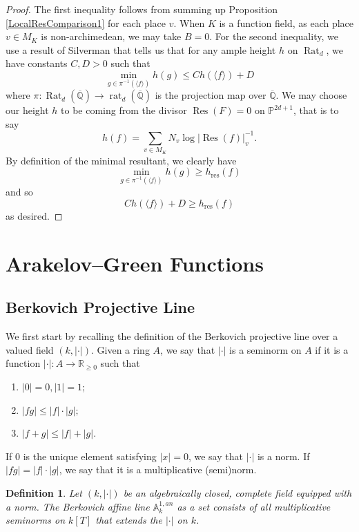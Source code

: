 \documentclass[10pt]{amsart}
\newcommand{\bb}{\mathbb}
\newcommand{\Res}{\operatorname{Res}}
\newcommand{\res}{\operatorname{res}}
\newcommand{\ovl}{\overline}
\newcommand{\berkA}{\mathbb{A}^{1,an}}
\newcommand{\Rat}{\operatorname{Rat}}
\newcommand{\rat}{\operatorname{rat}}
\numberwithin{theorem}{section}
\numberwithin{example}{section}
\newtheorem{definition}{Definition}
\numberwithin{definition}{section}
\begin{document}
\begin{proof}
The first inequality follows from summing up Proposition \ref{LocalResComparison1} for each place $v$. When $K$ is a function field, as each place $v \in M_K$ is non-archimedean, we may take $B = 0$. For the second inequality, we use a result of Silverman \cite[Lemma 6.32]{Sil12} that tells us that for any ample height $h$ on $\Rat_d$, we have constants $C,D > 0$ such that
$$\min_{g \in \pi^{-1}(\langle f \rangle)} h(g) \leq C h(\langle f \rangle) + D$$
where $\pi: \Rat_d(\ovl{\bb{Q}}) \to \rat_d(\ovl{\bb{Q}})$ is the projection map over $\ovl{\bb{Q}}$. We may choose our height $h$ to be coming from the divisor $\Res(F) = 0$ on $\bb{P}^{2d+1}$, that is to say
$$h(f) = \sum_{v \in M_K} N_v \log |\Res(f)|^{-1}_v.$$
By definition of the minimal resultant, we clearly have 
$$\min_{g \in \pi^{-1}(\langle f \rangle)} h(g) \geq h_{\res}(f)$$
and so
$$C h(\langle f \rangle) + D \geq h_{\res}(f)$$
as desired. 
\end{proof}

\section{Arakelov--Green Functions}
\subsection{Berkovich Projective Line} We first start by recalling the definition of the Berkovich projective line \cite{BR10, Ben19} over a valued field $(k, | \cdot |)$. Given a ring $A$, we say that $| \cdot |$ is a seminorm on $A$ if it is a function $| \cdot |: A \to \bb{R}_{\geq 0}$ such that 
\begin{enumerate}
\item $|0| = 0 , |1| = 1$;
\item $|fg| \leq |f| \cdot |g|;$
\item $|f+g| \leq |f| + |g|.$
\end{enumerate}

If $0$ is the unique element satisfying $|x| = 0$, we say that $| \cdot |$ is a norm. If $|fg| = |f| \cdot |g|$, we say that it is a multiplicative (semi)norm.

\begin{definition} \label{Chap2Defn1}
Let $(k, | \cdot |)$ be an algebraically closed, complete field equipped with a norm. The Berkovich affine line $\berkA_k$ as a set consists of all multiplicative seminorms on $k[T]$ that extends the $| \cdot |$ on $k$.     
\end{definition}
\end{document}
